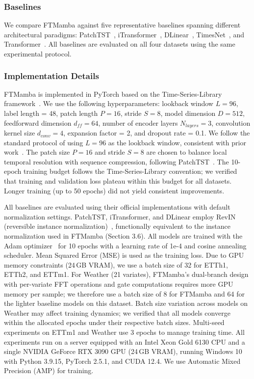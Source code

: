 \documentclass[symmetry,article,submit,pdftex,moreauthors]{Definitions/mdpi}
\begin{document}
\subsubsection{Baselines}

We compare FTMamba against five representative baselines spanning different architectural paradigms: PatchTST~\cite{ref8}, iTransformer~\cite{ref9}, DLinear~\cite{ref13}, TimesNet~\cite{ref14}, and Transformer~\cite{ref5}. All baselines are evaluated on all four datasets using the same experimental protocol.

\subsubsection{Implementation Details}

FTMamba is implemented in PyTorch based on the Time-Series-Library framework~\cite{ref18}. We use the following hyperparameters: lookback window $L = 96$, label length = 48, patch length $P = 16$, stride $S = 8$, model dimension $D = 512$, feedforward dimension $d_{ff} = 64$, number of encoder layers $N_{layers} = 3$, convolution kernel size $d_{conv} = 4$, expansion factor = 2, and dropout rate = 0.1. We follow the standard protocol of using $L = 96$ as the lookback window, consistent with prior work~\cite{ref8,ref9}. The patch size $P = 16$ and stride $S = 8$ are chosen to balance local temporal resolution with sequence compression, following PatchTST~\cite{ref8}. The 10-epoch training budget follows the Time-Series-Library convention; we verified that training and validation loss plateau within this budget for all datasets. Longer training (up to 50 epochs) did not yield consistent improvements.

All baselines are evaluated using their official implementations with default normalization settings. PatchTST, iTransformer, and DLinear employ RevIN (reversible instance normalization)~\cite{ref8,ref9,ref13}, functionally equivalent to the instance normalization used in FTMamba (Section 3.6). All models are trained with the Adam optimizer~\cite{ref19} for 10 epochs with a learning rate of 1e-4 and cosine annealing scheduler. Mean Squared Error (MSE) is used as the training loss. Due to GPU memory constraints (24\,GB VRAM), we use a batch size of 32 for ETTh1, ETTh2, and ETTm1. For Weather (21 variates), FTMamba's dual-branch design with per-variate FFT operations and gate computations requires more GPU memory per sample; we therefore use a batch size of 8 for FTMamba and 64 for the lighter baseline models on this dataset. Batch size variation across models on Weather may affect training dynamics; we verified that all models converge within the allocated epochs under their respective batch sizes. Multi-seed experiments on ETTm1 and Weather use 3 epochs to manage training time. All experiments run on a server equipped with an Intel Xeon Gold 6130 CPU and a single NVIDIA GeForce RTX 3090 GPU (24\,GB VRAM), running Windows 10 with Python 3.9.15, PyTorch 2.5.1, and CUDA 12.4. We use Automatic Mixed Precision (AMP) for training.
\end{document}
